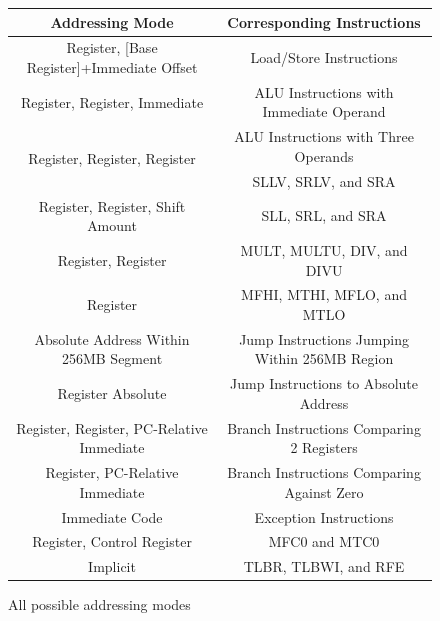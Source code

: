 \documentclass[]{scrartcl}
\begin{document}
\begin{figure}[H]
\begin{center}
\resizebox{0.9\textwidth}{!} {
\begin{tabular}{|c|c|}

\hline \textbf{Addressing Mode} &
       \textbf{Corresponding Instructions} \\

\hline Register, [Base Register]+Immediate Offset &
       Load/Store Instructions \\

\hline Register, Register, Immediate &
       ALU Instructions with Immediate Operand \\

\hline \multirow{2}{*}{Register, Register, Register} &
       ALU Instructions with Three Operands \\
\cline{2-2} & SLLV, SRLV, and SRA \\

\hline Register, Register, Shift Amount &
       SLL, SRL, and SRA \\

\hline Register, Register &
       MULT, MULTU, DIV, and DIVU \\

\hline Register &
       MFHI, MTHI, MFLO, and MTLO \\

\hline Absolute Address Within 256MB Segment &
       Jump Instructions Jumping Within 256MB Region \\

\hline Register Absolute &
       Jump Instructions to Absolute Address \\

\hline Register, Register, PC-Relative Immediate &
       Branch Instructions Comparing 2 Registers \\

\hline Register, PC-Relative Immediate &
       Branch Instructions Comparing Against Zero \\

\hline Immediate Code &
       Exception Instructions \\

\hline Register, Control Register &
       MFC0 and MTC0 \\

\hline Implicit &
       TLBR, TLBWI, and RFE \\

\hline

\end{tabular}
}
\end{center}
\caption{All possible addressing modes}
\label{addrmodes}
\end{figure}
\end{document}
